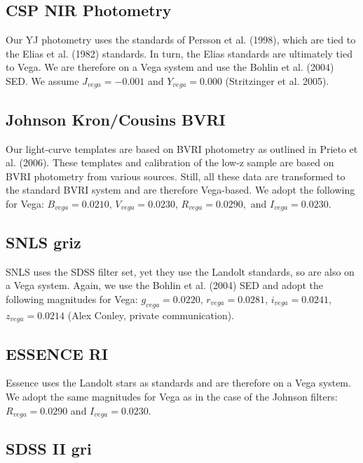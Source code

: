 \documentclass{aastex}
\begin{document}
\subsection{CSP NIR Photometry}

Our YJ photometry uses the standards of Persson et al. (1998), which
are tied to the Elias et al. (1982) standards. In turn, the Elias
standards are ultimately tied to Vega. We are therefore on a Vega
system and use the Bohlin et al. (2004) SED. We assume $J_{vega}=-0.001$
and $Y_{vega}=0.000$ (Stritzinger et al. 2005).


\subsection{Johnson Kron/Cousins BVRI}

Our light-curve templates are based on BVRI photometry as outlined
in Prieto et al. (2006). These templates and calibration of the low-z
sample are based on BVRI photometry from various sources. Still, all
these data are transformed to the standard BVRI system and are therefore
Vega-based. We adopt the following for Vega: $B_{vega}=0.0210$, $V_{vega}=0.0230$,
$R_{vega}=0.0290,$ and $I_{vega}=0.0230$.


\subsection{SNLS griz}

SNLS uses the SDSS filter set, yet they use the Landolt standards,
so are also on a Vega system. Again, we use the Bohlin et al. (2004)
SED and adopt the following magnitudes for Vega: $g_{vega}=0.0220$,
$r_{vega}=0.0281$, $i_{vega}=0.0241$, $z_{vega}=0.0214$ (Alex Conley,
private communication).


\subsection{ESSENCE RI}

Essence uses the Landolt stars as standards and are therefore on a
Vega system. We adopt the same magnitudes for Vega as in the case
of the Johnson filters: $R_{vega}=0.0290$ and $I_{vega}=0.0230$.


\subsection{SDSS II gri}
\end{document}
